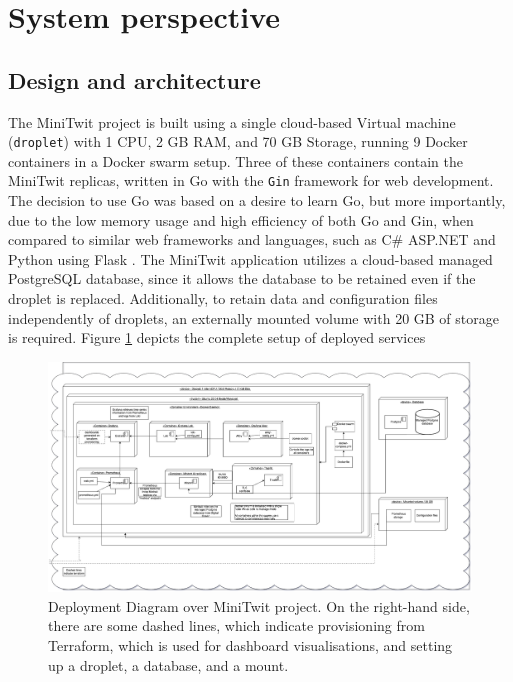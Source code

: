 \section{System perspective} \label{sp}
\subsection{Design and architecture} %
The MiniTwit project is built using a single cloud-based  Virtual machine (\texttt{droplet}) with 1 CPU, 2 GB RAM, and 70 GB Storage, running 9 Docker containers in a Docker swarm setup. Three of these containers contain the MiniTwit replicas, written in Go with the \texttt{Gin} framework for web development. The decision to use Go was based on a desire to learn Go, but more importantly, due to the low memory usage and high efficiency of both Go and Gin, when compared to similar web frameworks and languages, such as C\# ASP.NET and Python using Flask \parencite{benchmark}. The MiniTwit application utilizes a cloud-based managed PostgreSQL database, since it allows the database to be retained even if the droplet is replaced. Additionally, to retain data and configuration files independently of droplets, an externally mounted volume with 20 GB of storage is required. Figure \ref{fig:Deployment} depicts the complete setup of deployed services

\begin{landscape}
\begin{figure}[H]
    \centering
    \includegraphics[width=1\linewidth]{pictures/UML.drawio (5).png}
    \caption{Deployment Diagram over MiniTwit project. On the right-hand side, there are some dashed lines, which indicate provisioning from Terraform, which is used for dashboard visualisations, and setting up a droplet, a database, and a mount.}
    \label{fig:Deployment}
\end{figure}
\end{landscape}


